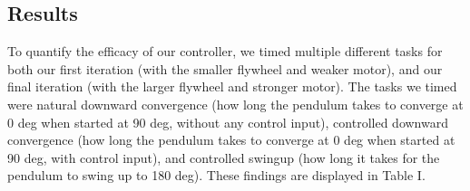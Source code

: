 \documentclass[conference]{IEEEtran}
\begin{document}
\subsection{Results}
To quantify the efficacy of our controller, we timed multiple different tasks for both our first iteration (with the smaller flywheel and weaker motor), and our final iteration (with the larger flywheel and stronger motor). The tasks we timed were natural downward convergence (how long the pendulum takes to converge at 0 deg when started at 90 deg, without any control input), controlled downward convergence (how long the pendulum takes to converge at 0 deg when started at 90 deg, with control input), and controlled swingup (how long it takes for the pendulum to swing up to 180 deg). These findings are displayed in Table I.
\begin{table}[h]
\caption{}
\end{table}
\end{document}
